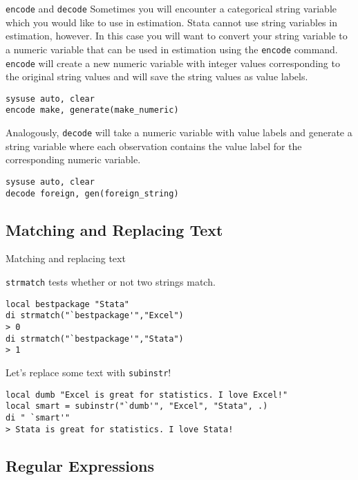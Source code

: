 \documentclass[fleqn, handout, 10pt]{beamer}
\def\lst{\lstinline}
\begin{document}
\begin{frame}[fragile]{\lst=encode= and \lst=decode=}
    Sometimes you will encounter a categorical string variable which you would like to use in estimation. Stata cannot use string variables in estimation, however. In this case you will want to convert your string variable to a numeric variable that can be used in estimation using the \lst=encode= command. \lst=encode= will create a new numeric variable with integer values corresponding to the original string values and will save the string values as value labels.
    \begin{lstlisting}
sysuse auto, clear
encode make, generate(make_numeric)
    \end{lstlisting} \pause
    Analogously, \lst=decode= will take a numeric variable with value labels and generate a string variable where each observation contains the value label for the corresponding numeric variable.
    \begin{lstlisting}
sysuse auto, clear
decode foreign, gen(foreign_string)
    \end{lstlisting}
\end{frame}

\subsection{Matching and Replacing Text}

\begin{frame}[fragile]{Matching and replacing text}

    \lst=strmatch= tests whether or not two strings match.
    \begin{lstlisting}
local bestpackage "Stata"
di strmatch("`bestpackage'","Excel")
> 0
di strmatch("`bestpackage'","Stata")
> 1
    \end{lstlisting}

    Let's replace some text with \lst=subinstr=!
    \begin{lstlisting}
local dumb "Excel is great for statistics. I love Excel!"
local smart = subinstr("`dumb'", "Excel", "Stata", .)
di " `smart'"
> Stata is great for statistics. I love Stata!
    \end{lstlisting}

\end{frame}


\subsection{Regular Expressions}
\end{document}
